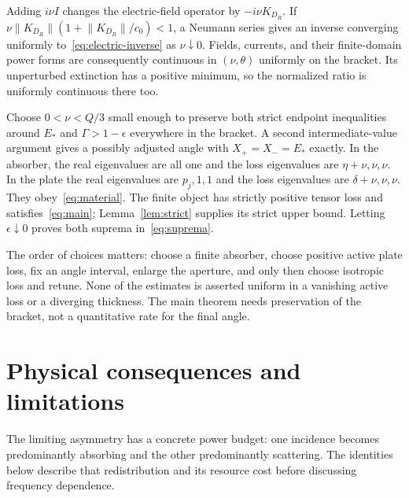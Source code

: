 \documentclass[11pt]{article}
\newcommand{\norm}[1]{\lVert #1\rVert}
\begin{document}
Adding $i\nu I$ changes the electric-field operator by $-i\nu K_{D_R}$. If $\nu\norm{K_{D_R}}(1+\norm{K_{D_R}}/c_0)<1$, a Neumann series gives an inverse converging uniformly to~\eqref{eq:electric-inverse} as $\nu\downarrow0$. Fields, currents, and their finite-domain power forms are consequently continuous in $(\nu,\theta)$ uniformly on the bracket. Its unperturbed extinction has a positive minimum, so the normalized ratio is uniformly continuous there too.

Choose $0<\nu<Q/3$ small enough to preserve both strict endpoint inequalities around $E_*$ and $\Gamma>1-\epsilon$ everywhere in the bracket. A second intermediate-value argument gives a possibly adjusted angle with $X_+=X_-=E_*$ exactly. In the absorber, the real eigenvalues are all one and the loss eigenvalues are $\eta+\nu,\nu,\nu$. In the plate the real eigenvalues are $p_j,1,1$ and the loss eigenvalues are $\delta+\nu,\nu,\nu$. They obey~\eqref{eq:material}. The finite object has strictly positive tensor loss and satisfies~\eqref{eq:main}; Lemma~\ref{lem:strict} supplies its strict upper bound. Letting $\epsilon\downarrow0$ proves both suprema in~\eqref{eq:suprema}.

The order of choices matters: choose a finite absorber, choose positive active plate loss, fix an angle interval, enlarge the aperture, and only then choose isotropic loss and retune. None of the estimates is asserted uniform in a vanishing active loss or a diverging thickness. The main theorem needs preservation of the bracket, not a quantitative rate for the final angle.

\section{Physical consequences and limitations}\label{sec:consequences}
The limiting asymmetry has a concrete power budget: one incidence becomes predominantly absorbing and the other predominantly scattering. The identities below describe that redistribution and its resource cost before discussing frequency dependence.
\end{document}

